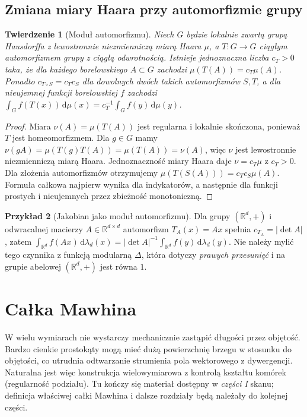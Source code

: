 \documentclass[11pt,a4paper]{article}
\numberwithin{equation}{section}
\theoremstyle{plain}
\newtheorem{twierdzenie}{Twierdzenie}[section]
\theoremstyle{definition}
\newtheorem{przyklad}[twierdzenie]{Przykład}
\theoremstyle{remark}
\newcommand{\R}{\mathbb R}
\begin{document}
\subsection*{Zmiana miary Haara przy automorfizmie grupy}
\begin{twierdzenie}[Moduł automorfizmu]\label{tw:haar-automorfizm}
Niech $G$ będzie lokalnie zwartą grupą Hausdorffa z lewostronnie niezmienniczą miarą Haara $\mu$, a $T:G\to G$ ciągłym automorfizmem grupy z ciągłą odwrotnością. Istnieje jednoznaczna liczba $c_T>0$ taka, że dla każdego borelowskiego $A\subset G$ zachodzi $\mu(T(A))=c_T\mu(A)$. Ponadto $c_{T\circ S}=c_Tc_S$ dla dowolnych dwóch takich automorfizmów $S,T$, a dla nieujemnej funkcji borelowskiej $f$ zachodzi
$\int_G f(T(x))\,\mathrm d\mu(x)=c_T^{-1}\int_Gf(y)\,\mathrm d\mu(y)$.
\end{twierdzenie}
\begin{proof}
Miara $\nu(A)=\mu(T(A))$ jest regularna i lokalnie skończona, ponieważ $T$ jest homeomorfizmem. Dla $g\in G$ mamy $\nu(gA)=\mu(T(g)T(A))=\mu(T(A))=\nu(A)$, więc $\nu$ jest lewostronnie niezmienniczą miarą Haara. Jednoznaczność miary Haara daje $\nu=c_T\mu$ z $c_T>0$. Dla złożenia automorfizmów otrzymujemy $\mu(T(S(A)))=c_Tc_S\mu(A)$. Formuła całkowa najpierw wynika dla indykatorów, a następnie dla funkcji prostych i nieujemnych przez zbieżność monotoniczną.
\end{proof}
\begin{przyklad}[Jakobian jako moduł automorfizmu]
Dla grupy $(\R^d,+)$ i odwracalnej macierzy $A\in\R^{d\times d}$ automorfizm $T_A(x)=Ax$ spełnia $c_{T_A}=|\det A|$, zatem
$\int_{\R^d}f(Ax)\,\mathrm d\lambda_d(x)=|\det A|^{-1}\int_{\R^d}f(y)\,\mathrm d\lambda_d(y)$. Nie należy mylić tego czynnika z funkcją modularną $\Delta$, która dotyczy \emph{prawych przesunięć} i na grupie abelowej $(\R^d,+)$ jest równa $1$.
\end{przyklad}

\section{Całka Mawhina}
W wielu wymiarach nie wystarczy mechanicznie zastąpić długości przez objętość. Bardzo cienkie prostokąty mogą mieć dużą powierzchnię brzegu w stosunku do objętości, co utrudnia odtwarzanie strumienia pola wektorowego z dywergencji. Naturalna jest więc konstrukcja wielowymiarowa z kontrolą kształtu komórek (regularność podziału). Tu kończy się materiał dostępny w \emph{części I} skanu; definicja właściwej całki Mawhina i dalsze rozdziały będą należały do kolejnej części.
\end{document}
